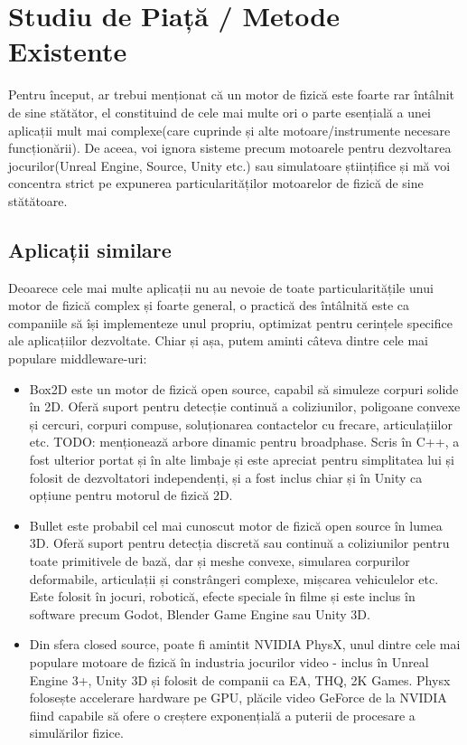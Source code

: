 \documentclass[12pt,a4paper]{report}
\begin{document}
\chapter{Studiu de Piață / Metode Existente}
Pentru început, ar trebui menționat că un motor de fizică este foarte rar întâlnit de sine stătător, el constituind de cele mai multe ori o parte esențială a unei aplicații mult mai complexe(care cuprinde și alte motoare/instrumente necesare funcționării). De aceea, voi ignora sisteme precum motoarele pentru dezvoltarea jocurilor(Unreal Engine, Source, Unity etc.) sau simulatoare științifice și mă voi concentra strict pe expunerea particularităților motoarelor de fizică de sine stătătoare.
\section{Aplicații similare}
Deoarece cele mai multe aplicații nu au nevoie de toate particularitățile unui motor de fizică complex și foarte general, o practică des întâlnită este ca companiile să își implementeze unul propriu, optimizat pentru cerințele specifice ale aplicațiilor dezvoltate. Chiar și așa, putem aminti câteva dintre cele mai populare middleware-uri: 
\begin{itemize}
	\item Box2D\cite{box2D} este un motor de fizică open source, capabil să simuleze corpuri solide în 2D. Oferă suport pentru detecție continuă a coliziunilor, poligoane convexe și cercuri, corpuri compuse, soluționarea contactelor cu frecare, articulațiilor etc. TODO: menționează arbore dinamic pentru broadphase. 
	Scris în C++, a fost ulterior portat și în alte limbaje și este apreciat pentru simplitatea lui și folosit de dezvoltatori independenți, și a fost inclus chiar și în Unity ca opțiune pentru motorul de fizică 2D.
	\item Bullet\cite{bullet} este probabil cel mai cunoscut motor de fizică open source în lumea 3D. Oferă suport pentru detecția discretă sau continuă a coliziunilor pentru toate primitivele de bază, dar și meshe convexe, simularea corpurilor deformabile, articulații și constrângeri complexe, mișcarea vehiculelor etc. Este folosit în jocuri, robotică, efecte speciale în filme și este inclus în software precum Godot, Blender Game Engine sau Unity 3D.
	\item Din sfera closed source, poate fi amintit NVIDIA PhysX, unul dintre cele mai populare motoare de fizică în industria jocurilor video - inclus în Unreal Engine 3+, Unity 3D și folosit de companii ca EA, THQ, 2K Games. Physx folosește accelerare hardware pe GPU, plăcile video GeForce de la NVIDIA fiind capabile să ofere o creștere exponențială a puterii de procesare a simulărilor fizice.  
\end{itemize}
\end{document}

